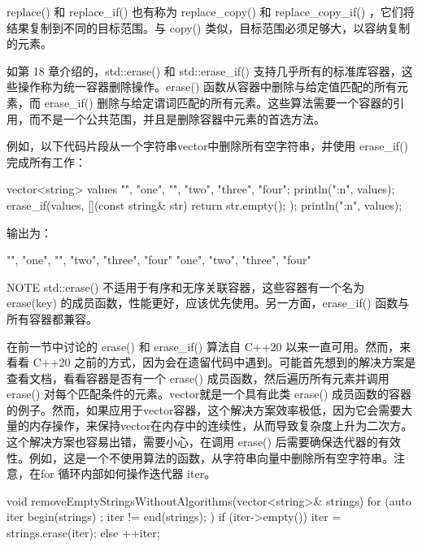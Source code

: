 replace() 和 replace\_if() 也有称为 replace\_copy() 和 replace\_copy\_if() ，它们将结果复制到不同的目标范围。与 copy() 类似，目标范围必须足够大，以容纳复制的元素。


如第 18 章介绍的，std::erase() 和 std::erase\_if() 支持几乎所有的标准库容器，这些操作称为统一容器删除操作。erase() 函数从容器中删除与给定值匹配的所有元素，而 erase\_if() 删除与给定谓词匹配的所有元素。这些算法需要一个容器的引用，而不是一个公共范围，并且是删除容器中元素的首选方法。

例如，以下代码片段从一个字符串vector中删除所有空字符串，并使用 erase\_if() 完成所有工作：

\begin{cpp}
vector<string> values {"", "one", "", "two", "three", "four"};
println("{:n}", values);
erase_if(values, [](const string& str){ return str.empty(); });
println("{:n}", values);
\end{cpp}

输出为：

\begin{shell}
"", "one", "", "two", "three", "four"
"one", "two", "three", "four"
\end{shell}

\begin{myNotic}{NOTE}
std::erase() 不适用于有序和无序关联容器，这些容器有一个名为 erase(key) 的成员函数，性能更好，应该优先使用。另一方面，erase\_if() 函数与所有容器都兼容。
\end{myNotic}


在前一节中讨论的 erase() 和 erase\_if() 算法自 C++20 以来一直可用。然而，来看看 C++20 之前的方式，因为会在遗留代码中遇到。可能首先想到的解决方案是查看文档，看看容器是否有一个 erase() 成员函数，然后遍历所有元素并调用 erase() 对每个匹配条件的元素。vector就是一个具有此类 erase() 成员函数的容器的例子。然而，如果应用于vector容器，这个解决方案效率极低，因为它会需要大量的内存操作，来保持vector在内存中的连续性，从而导致复杂度上升为二次方。这个解决方案也容易出错，需要小心，在调用 erase() 后需要确保迭代器的有效性。例如，这是一个不使用算法的函数，从字符串向量中删除所有空字符串。注意，在for 循环内部如何操作迭代器 iter。

\begin{cpp}
void removeEmptyStringsWithoutAlgorithms(vector<string>& strings)
{
    for (auto iter { begin(strings) }; iter != end(strings); ) {
        if (iter->empty()) {
            iter = strings.erase(iter);
        } else {
            ++iter;
        }
    }
}
\end{cpp}

